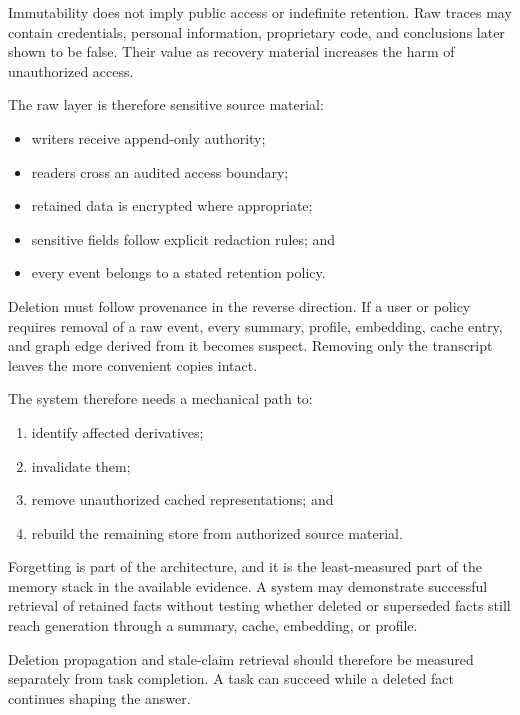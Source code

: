 Immutability does not imply public access or indefinite retention. Raw traces may contain credentials, personal information, proprietary code, and conclusions later shown to be false. Their value as recovery material increases the harm of unauthorized access.


The raw layer is therefore sensitive source material:

\begin{itemize}
\tightlist
\item
  writers receive append-only authority;
\item
  readers cross an audited access boundary;
\item
  retained data is encrypted where appropriate;
\item
  sensitive fields follow explicit redaction rules; and
\item
  every event belongs to a stated retention policy.
\end{itemize}

Deletion must follow provenance in the reverse direction. If a user or policy requires removal of a raw event, every summary, profile, embedding, cache entry, and graph edge derived from it becomes suspect. Removing only the transcript leaves the more convenient copies intact.


The system therefore needs a mechanical path to:

\begin{enumerate}
\def\labelenumi{\arabic{enumi}.}
\tightlist
\item
  identify affected derivatives;
\item
  invalidate them;
\item
  remove unauthorized cached representations; and
\item
  rebuild the remaining store from authorized source material.
\end{enumerate}

Forgetting is part of the architecture, and it is the least-measured part of the memory stack in the available evidence. A system may demonstrate successful retrieval of retained facts without testing whether deleted or superseded facts still reach generation through a summary, cache, embedding, or profile.

Deletion propagation and stale-claim retrieval should therefore be measured separately from task completion. A task can succeed while a deleted fact continues shaping the answer.

